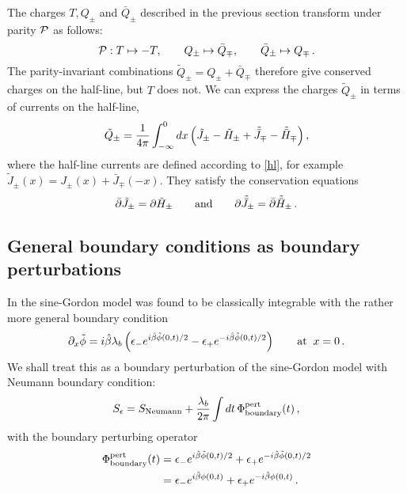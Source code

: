 \documentclass[a4paper,12pt]{article}
\newcommand{\hb}{\hat{\beta}}
\numberwithin{equation}{section}
\begin{document}
The charges  $T, Q_\pm$ and $\bar{Q}_\pm$ described in the
previous section transform under parity ${\cal P}$ as follows:
\begin{equation} {\cal P} : T \mapsto -T, \qquad Q_\pm \mapsto
\bar{Q}_\mp , \qquad \bar{Q}_\pm \mapsto Q_\mp\,.\end{equation}
The parity-invariant combinations $ \tilde{Q}_\pm = Q_\pm +
\bar{Q}_\mp$ therefore give conserved charges on the half-line,
but $T$ does not. We can express the charges $\tilde{Q}_\pm$ in
terms of currents on the half-line,
\begin{equation}\label{qce}
\tilde{Q}_\pm = {1\over 4\pi} \int_{-\infty}^0 dx\left(
\tilde{J}_\pm - \tilde{H}_\pm +\tilde{\bar{J}}_\mp -
\tilde{\bar{H}}_\mp\right),
\end{equation}
where the half-line currents are defined according to \eqref{hl},
for example $\tilde{J}_\pm(x)=J_\pm(x)+\bar{J}_\mp(-x)$. They
satisfy the conservation equations \begin{equation}
\bar{\partial}\tilde{J}_\pm =
\partial \tilde{H}_\pm \qquad {\rm and} \qquad \partial \tilde{\bar{J}}_\pm =
\bar{\partial}\tilde{\bar{H}}_\pm\,.\end{equation}




\subsection{General boundary conditions as boundary perturbations\label{sectgbcbp}}

In \cite{Skl88,Gho94} the sine-Gordon model was found to be
classically integrable with the rather more general boundary
condition
\begin{equation}\label{gbc}
  \partial_x \tilde\phi = i\hb\lambda_b \left( \epsilon_- e^{i\hb
  \tilde{\phi}(0,t)/2} -   \epsilon_+ e^{-i\hb \tilde{\phi}(0,t)/2}
  \right)\qquad{\rm at}\;\; x=0\,.
\end{equation}
We shall treat this as a boundary perturbation of the sine-Gordon
model with Neumann boundary condition:
\begin{equation}
  S_\epsilon = S_{\rm Neumann} +{\lambda_b\over 2\pi} \int dt\,
  \Phi^{\rm pert}_{\rm boundary}(t)\,,
\end{equation}
with the boundary perturbing operator
\begin{align}\label{gbp}
  \Phi^{\rm pert}_{\rm boundary}(t) & =  \epsilon_- e^{i\hb
  \tilde{\phi}(0,t)/2} + \epsilon_+ e^{-i\hb
  \tilde{\phi}(0,t)/2}\\
  &=\epsilon_- e^{i\hb \phi(0,t)} + \epsilon_+
  e^{-i\hb \phi(0,t)}\,.\notag
\end{align}
\end{document}
